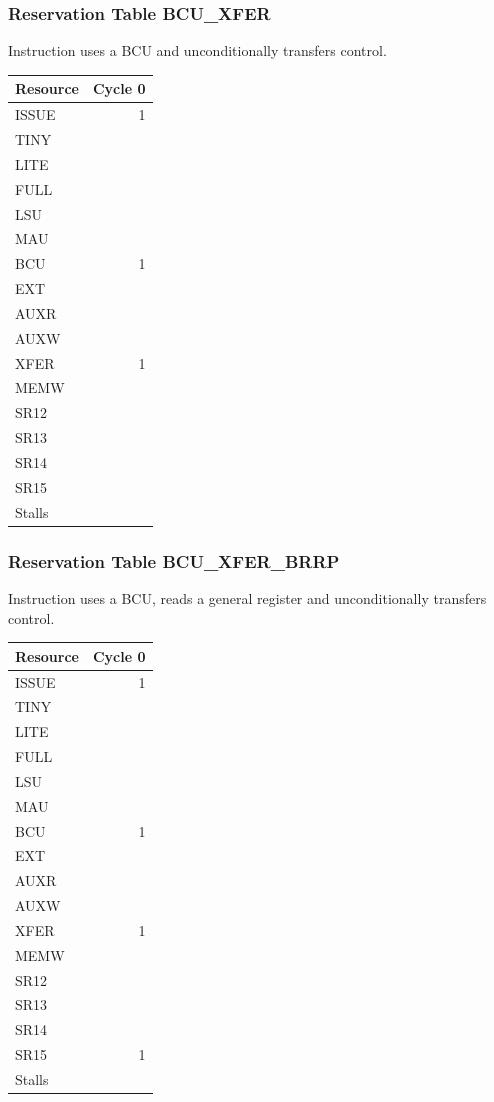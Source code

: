 \subsubsection{Reservation Table BCU\_XFER} \label{sec:reservation-BCU-XFER}

Instruction uses a BCU and unconditionally transfers control.
\medskip

\begin{tabular}{|l|r|} \hline
Resource	& Cycle 0 \\ \hline
\textsf{ISSUE}	& 1	\\
\textsf{TINY}	& 	\\
\textsf{LITE}	& 	\\
\textsf{FULL}	& 	\\
\textsf{LSU}	& 	\\
\textsf{MAU}	& 	\\
\textsf{BCU}	& 1	\\
\textsf{EXT}	& 	\\
\textsf{AUXR}	& 	\\
\textsf{AUXW}	& 	\\
\textsf{XFER}	& 1	\\
\textsf{MEMW}	& 	\\
\textsf{SR12}	& 	\\
\textsf{SR13}	& 	\\
\textsf{SR14}	& 	\\
\textsf{SR15}	& 	\\
\hline Stalls	& 	\\
\hline \end{tabular}

\subsubsection{Reservation Table BCU\_XFER\_BRRP} \label{sec:reservation-BCU-XFER-BRRP}

Instruction uses a BCU, reads a general register and unconditionally transfers control.
\medskip

\begin{tabular}{|l|r|} \hline
Resource	& Cycle 0 \\ \hline
\textsf{ISSUE}	& 1	\\
\textsf{TINY}	& 	\\
\textsf{LITE}	& 	\\
\textsf{FULL}	& 	\\
\textsf{LSU}	& 	\\
\textsf{MAU}	& 	\\
\textsf{BCU}	& 1	\\
\textsf{EXT}	& 	\\
\textsf{AUXR}	& 	\\
\textsf{AUXW}	& 	\\
\textsf{XFER}	& 1	\\
\textsf{MEMW}	& 	\\
\textsf{SR12}	& 	\\
\textsf{SR13}	& 	\\
\textsf{SR14}	& 	\\
\textsf{SR15}	& 1	\\
\hline Stalls	& 	\\
\hline \end{tabular}

